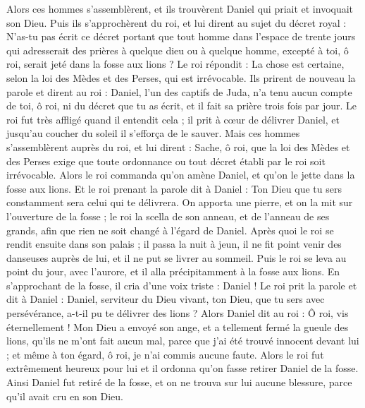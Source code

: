 \begin{multicols}{2}
Alors ces hommes s'assemblèrent, et ils trouvèrent Daniel qui priait et invoquait son Dieu.
Puis ils s'approchèrent du roi, et lui dirent au sujet du décret royal : N'as-tu pas écrit ce décret portant que tout homme dans l'espace de trente jours qui adresserait des prières à quelque dieu ou à quelque homme, excepté à toi, ô roi, serait jeté dans la fosse aux lions ? Le roi répondit : La chose est certaine, selon la loi des Mèdes et des Perses, qui est irrévocable.
Ils prirent de nouveau la parole et dirent au roi : Daniel, l'un des captifs de Juda, n'a tenu aucun compte de toi, ô roi, ni du décret que tu as écrit, et il fait sa prière trois fois par jour.
Le roi fut très affligé quand il entendit cela ; il prit à cœur de délivrer Daniel, et jusqu'au coucher du soleil il s'efforça de le sauver.
Mais ces hommes s'assemblèrent auprès du roi, et lui dirent : Sache, ô roi, que la loi des Mèdes et des Perses exige que toute ordonnance ou tout décret établi par le roi soit irrévocable.
Alors le roi commanda qu'on amène Daniel, et qu'on le jette dans la fosse aux lions. Et le roi prenant la parole dit à Daniel : Ton Dieu que tu sers constamment sera celui qui te délivrera.
On apporta une pierre, et on la mit sur l'ouverture de la fosse ; le roi la scella de son anneau, et de l'anneau de ses grands, afin que rien ne soit changé à l'égard de Daniel.
Après quoi le roi se rendit ensuite dans son palais ; il passa la nuit à jeun, il ne fit point venir des danseuses auprès de lui, et il ne put se livrer au sommeil.
Puis le roi se leva au point du jour, avec l'aurore, et il alla précipitamment à la fosse aux lions.
En s'approchant de la fosse, il cria d'une voix triste : Daniel ! Le roi prit la parole et dit à Daniel : Daniel, serviteur du Dieu vivant, ton Dieu, que tu sers avec persévérance, a-t-il pu te délivrer des lions ?
Alors Daniel dit au roi : Ô roi, vis éternellement !
Mon Dieu a envoyé son ange, et a tellement fermé la gueule des lions, qu'ils ne m'ont fait aucun mal, parce que j'ai été trouvé innocent devant lui ; et même à ton égard, ô roi, je n'ai commis aucune faute. 
Alors le roi fut extrêmement heureux pour lui et il ordonna qu'on fasse retirer Daniel de la fosse. Ainsi Daniel fut retiré de la fosse, et on ne trouva sur lui aucune blessure, parce qu'il avait cru en son Dieu.

\end{multicols}

